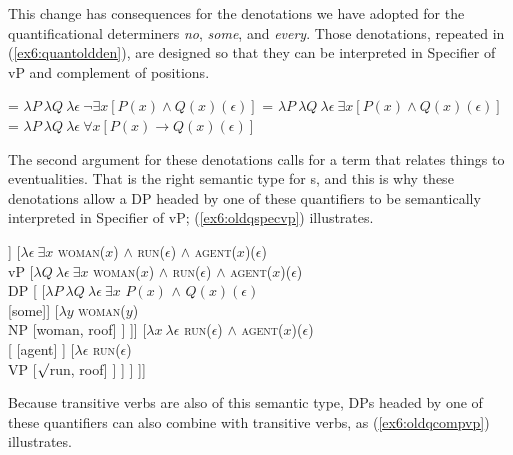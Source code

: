 This change has consequences for the denotations we have adopted for the quantificational determiners \emph{no}, \emph{some}, and \emph{every}. Those denotations, repeated in (\ref{ex6:quantoldden}), are designed so that they can be interpreted in Specifier of vP and complement of  positions.
\begin{exe}
\raggedright
	\ex \label{ex6:quantoldden}
	\begin{xlist}
		\ex {} = $\lambda P\ \lambda Q\ \lambda \epsilon\ \neg\exists x [P(x) \wedge Q(x)(\epsilon)]$
		\ex {} = $\lambda P\ \lambda Q\ \lambda \epsilon\ \exists x [P(x) \wedge Q(x)(\epsilon)]$
		\ex {} = $\lambda P\ \lambda Q\ \lambda \epsilon\ \forall x [P(x) \rightarrow Q(x)(\epsilon)]$
	\end{xlist}
\end{exe}
The second argument for these denotations calls for a term that relates things to eventualities. That is the right semantic type for s, and this is why these denotations allow a DP headed by one of these quantifiers to be semantically interpreted in Specifier of vP; (\ref{ex6:oldqspecvp}) illustrates.
\begin{fullwidth}
\begin{exe}
\raggedright
	\ex \label{ex6:oldqspecvp}
	\hspace*{-20pt}
	\small
	\begin{forest}
	[AspP [\ibar{Asp}
		[\obar{Asp} [asp]]
		[$\lambda \epsilon\ \exists x$ \textsc{woman}($x$) $\wedge$ \textsc{run}($\epsilon$) $\wedge$ \textsc{agent}($x$)($\epsilon$)\\vP 
			[$\lambda Q\ \lambda \epsilon\ \exists x$ \textsc{woman}($x$) $\wedge$ \textsc{run}($\epsilon$) $\wedge$ \textsc{agent}($x$)($\epsilon$)\\DP [
				[$\lambda P\ \lambda Q\ \lambda \epsilon\ \exists x$ $P(x)$ $\wedge$ $Q(x)(\epsilon)$\\  [some]]
				[$\lambda y$ \textsc{woman}($y$)\\NP [woman, roof] ]
			]]
			[$\lambda x\ \lambda \epsilon$ \textsc{run}($\epsilon$) $\wedge$ \textsc{agent}($x$)($\epsilon$)\\
				[ [agent] ]
				[$\lambda \epsilon$ \textsc{run}($\epsilon$)\\ VP [$\surd$run, roof] ]
			]
		]
	]]
	\end{forest}
\end{exe}
\end{fullwidth}
\medskip
Because transitive verbs are also of this semantic type, DPs headed by one of these quantifiers can also combine with transitive verbs, as (\ref{ex6:oldqcompvp}) illustrates.
